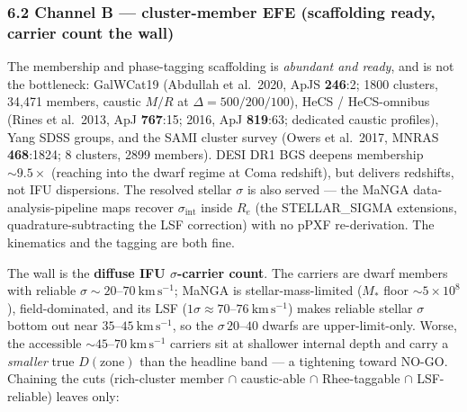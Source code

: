 \documentclass[
]{article}
\begin{document}
\subsubsection{6.2 Channel B --- cluster-member EFE (scaffolding ready,
carrier count the
wall)}\label{channel-b-cluster-member-efe-scaffolding-ready-carrier-count-the-wall}

The membership and phase-tagging scaffolding is \emph{abundant and
ready}, and is not the bottleneck: GalWCat19 (Abdullah et al.~2020, ApJS
\textbf{246}:2; 1800 clusters, 34,471 members, caustic \(M/R\) at
\(\Delta=500/200/100\)), HeCS / HeCS-omnibus (Rines et al.~2013, ApJ
\textbf{767}:15; 2016, ApJ \textbf{819}:63; dedicated caustic profiles),
Yang SDSS groups, and the SAMI cluster survey (Owers et al.~2017, MNRAS
\textbf{468}:1824; 8 clusters, 2899 members). DESI DR1 BGS deepens
membership \(\sim9.5\times\) (reaching into the dwarf regime at Coma
redshift), but delivers redshifts, not IFU dispersions. The resolved
stellar \(\sigma\) is also served --- the MaNGA data-analysis-pipeline
maps recover \(\sigma_\mathrm{int}\) inside \(R_e\) (the STELLAR\_SIGMA
extensions, quadrature-subtracting the LSF correction) with no pPXF
re-derivation. The kinematics and the tagging are both fine.

The wall is the \textbf{diffuse IFU \(\sigma\)-carrier count}. The
carriers are dwarf members with reliable
\(\sigma\sim20\)--\(70\ \mathrm{km\,s^{-1}}\); MaNGA is
stellar-mass-limited (\(M_\ast\) floor \(\sim5\times10^8\)),
field-dominated, and its LSF
(\(1\sigma\approx70\)--\(76\ \mathrm{km\,s^{-1}}\)) makes reliable
stellar \(\sigma\) bottom out near \(35\)--\(45\ \mathrm{km\,s^{-1}}\),
so the \(\sigma\,20\)--\(40\) dwarfs are upper-limit-only. Worse, the
accessible \(\sim45\)--\(70\ \mathrm{km\,s^{-1}}\) carriers sit at
shallower internal depth and carry a \emph{smaller} true
\(D(\text{zone})\) than the headline band --- a tightening toward NO-GO.
Chaining the cuts (rich-cluster member \(\cap\) caustic-able \(\cap\)
Rhee-taggable \(\cap\) LSF-reliable) leaves only:
\end{document}
